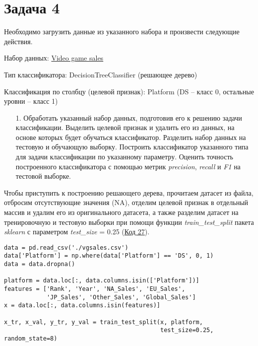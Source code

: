\section{Задача 4}

Необходимо загрузить данные из указанного набора и произвести следующие действия.

Набор данных: \href{https://www.kaggle.com/gregorut/videogamesales}{Video game sales}

Тип классификатора: DecisionTreeClassifier (решающее дерево)

Классификация по столбцу (целевой признак): Platform (DS – класс 0, остальные
уровни – класс 1)

\begin{enumerate}
    \item[1.] Обработать указанный набор данных, подготовив его к решению задачи классификации. Выделить целевой признак и удалить его из данных, на основе которых будет обучаться классификатор. Разделить набор данных на тестовую и обучающую выборку. Построить классификатор указанного типа для задачи классификации по указанному параметру. Оценить точность построенного классификатора с помощью метрик \textit{precision}, \textit{recall} и \textit{F1} на тестовой выборке.
\end{enumerate}

Чтобы приступить к построению решающего дерева, прочитаем датасет из файла, отбросим отсутствующие значения (NA), отделим целевой признак в отдельный массив и удалим его из оригинального датасета, а также разделим датасет на тренировочную и тестовую выборки при помощи функции \textit{train\_test\_split} пакета \textit{sklearn} с параметром \textit{test\_size} = 0.25 (\hyperref[code:27]{Код 27}).

\begin{code}
\begin{verbatim}
data = pd.read_csv('./vgsales.csv')
data['Platform'] = np.where(data['Platform'] == 'DS', 0, 1)
data = data.dropna()

platform = data.loc[:, data.columns.isin(['Platform'])]
features = ['Rank', 'Year', 'NA_Sales', 'EU_Sales',
            'JP_Sales', 'Other_Sales', 'Global_Sales']
x = data.loc[:, data.columns.isin(features)]

x_tr, x_val, y_tr, y_val = train_test_split(x, platform,
                                            test_size=0.25, random_state=8)
\end{verbatim}
\label{code:27}
\end{code}

